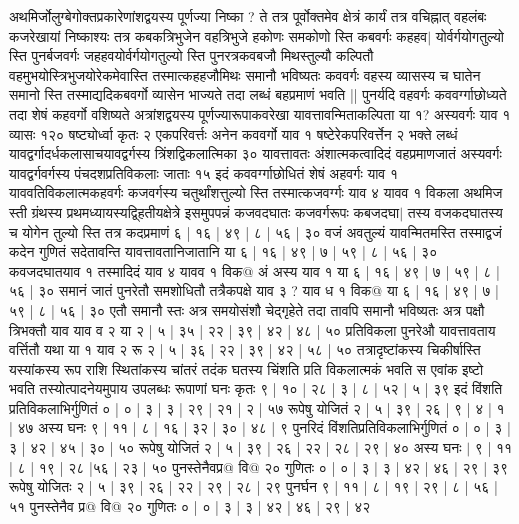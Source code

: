 \documentclass[12pt]{article}
\begin{document}
{अथमिर्जोलुग्बेगोक्तप्रकारेणांशद्वयस्य पूर्णज्या निष्का ? ते तत्र पूर्वोक्तमेव क्षेत्रं
कार्यं तत्र वचिह्नात् वहलंबः कजरेखायां निष्काश्यः तत्र कबकत्रिभुजेन वहत्रिभुजे हकोणः समकोणो स्ति कबवर्गः कहहव$|$
योर्वर्गयोगतुल्यो स्ति पुनर्बजवर्गः जहहवयोर्वर्गयोगतुल्यो स्ति
पुनरत्रकवबजौ मिथस्तुल्यौ कल्पितौ वहमुभ\-योस्त्रिभुजयोरेकमेवास्ति तस्मात्कहहजौमिथः समानौ भविष्यतः कववर्गः वहस्य व्यासस्य च घातेन समानो स्ति तस्माद्यदिकबवर्गो व्यासेन भाज्यते तदा लब्धं बहप्रमाणं भवति ||
पुनर्यदि वहवर्गः कववर्ग्गाछोध्यते तदा शेषं कहवर्गो वशिष्यते अत्रांशद्वयस्य पूर्णज्यारूपाकवरेखा
यावत्तावन्मिताकल्पिता या १? अस्यवर्गः
याव १ व्यासः १२० षष्ट्योर्ध्वा कृतः २ एकपरिवर्त्तः अनेन कववर्गो याव १ षष्टेरेकपरिवर्त्तेन २ भक्ते लब्धं
यावद्वर्गादर्धकलासाचयावद्वर्गस्य त्रिंशद्विकलात्मिका ३०
यावत्तावतः अंशात्मकत्वादिदं वहप्रमाणजातं अस्यवर्गः यावद्वर्गवर्गस्य
पंचदशप्रतिविकलाः जाताः १५ इदं कववर्ग्गाछोधितं शेषं अहवर्गः याव १ याववतिविकलात्मकहवर्गः कजवर्गस्य चतुर्थांशत्तुल्यो स्ति तस्मात्कजवर्ग्गः याव ४ यावव १
विकला अथमिज स्ती ग्रंथस्य प्रथमध्यायस्यद्व्हितीयक्षेत्रे इसमुपपन्नं कजवदघातः कजवर्गरूपः
कबजदघा$|$
तस्य वजकदघातस्य च योगेन तुल्यो स्ति तत्र कदप्रमाणं ६ | १६ | ४९ | ८ | ५६ | ३० वजं अवतुल्यं
यावन्मितमस्ति तस्माद्वजं कदेन गुणितं सदेतावन्ति यावत्तावतानिजातानि या ६ | १६ | ४९ | ७ | ५९ | ८ | ५६ | ३० कवजदघातयाव १
तस्मादिदं याव ४ यावव १ विक@ अं अस्य याव १ या ६ | १६ | ४९ | ७ | ५९ | ८ | ५६ | ३० समानं जातं पुनरेतौ समशोधितौ तत्रैकपक्षे
याव ३ ? याव ध १ विक@
या ६ | १६ | ४९ | ७ | ५९ | ८ | ५६ | ३० एतौ समानौ स्तः अत्र समयोसंशौ चेद्गृहेते तदा तावपि
समानौ भविष्यतः अत्र पक्षौ त्रिभक्तौ याव
याव व २ या २ | ५ | ३५ | २२ | ३९ | ४२ | ४८ | ५० प्रतिविकला
पुनरेऔ यावत्तावताय वर्त्तितौ यथा या १
याव २ रू २ | ५ | ३६ | २२ | ३९ | ४२ | ५८ | ५०
तत्रादृष्टांकस्य चिकीर्षास्ति यस्यांकस्य रूप राशि
स्थितांकस्य चांतरं तदंक घतस्य चिंशति
प्रति विकलात्मकं भवति स एवांक इष्टो भवति तस्योत्पादनेयमुपाय उपलब्धः रूपाणां घनः कृतः ९ | १० | २८ | ३ | ८ | ५२ | ५ | ३९
इदं विंशति प्रतिविकलाभिर्गुणितं ० | ० | ३ | ३ | २९ | २१ | २ | ५७ रूपेषु योजितं २ | ५ | ३९ | २६ | ९ | ४ | १ | ४७ अस्य घनः ९ | ११ | ८ | १६ | ३२ | ३० | ४८ | ९ पुनरिदं विंशतिप्रतिविकलाभिर्गुणितं ० | ० | ३ | ३ | ४२ | ४५ | ३० | ५०
रूपेषु योजितं २ | ५ | ३९ | २६ | २२ | २८ | २९ | ४० अस्य घनः $|$
९ | ११ | ८ | १९ | २८ |५६ | २३ | ५० पुनस्तेनैवप्र@ वि@
२० गुणितः ० | ० | ३ | ३ | ४२ | ४६ | २९ | ३९
रूपेषु योजितः २ | ५ | ३९ | २६ | २२ | २९ | २८ | २९ पुनर्घन ९ | ११ | ८ | १९ | २९ | ८ | ५६ | ५१ पुनस्तेनैव प्र@ वि@ २० गुणितः ० | ० | ३ | ३ | ४२ | ४६ | २९ | ४२
}
\end{document}
